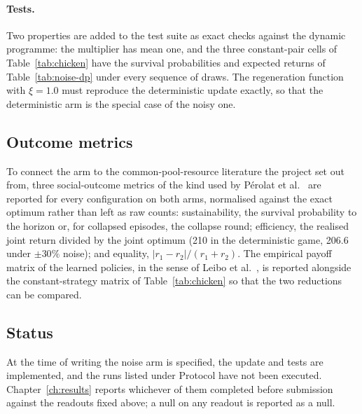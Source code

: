 \paragraph{Tests.}
Two properties are added to the test suite as exact checks against the
dynamic programme: the multiplier has mean one, and the three constant-pair
cells of Table~\ref{tab:chicken} have the survival probabilities and
expected returns of Table~\ref{tab:noise-dp} under every sequence of draws.
The regeneration function with \(\xi = 1.0\) must reproduce the
deterministic update exactly, so that the deterministic arm is the
special case of the noisy one.

\subsection{Outcome metrics}

To connect the arm to the common-pool-resource literature the project set
out from, three social-outcome metrics of the kind used by P\'erolat et
al.\ \cite{perolat2017} are reported for every configuration on both arms,
normalised against the exact optimum rather than left as raw counts:
sustainability, the survival probability to the horizon or, for collapsed
episodes, the collapse round; efficiency, the realised joint return divided
by the joint optimum (210 in the deterministic game, 206.6 under
\(\pm 30\%\) noise); and equality, \(|r_1 - r_2| / (r_1 + r_2)\).
The empirical payoff matrix of the learned policies, in the sense of
Leibo et al.\ \cite{leibo2017}, is reported alongside the constant-strategy
matrix of Table~\ref{tab:chicken} so that the two reductions can be
compared.

\subsection{Status}

At the time of writing the noise arm is specified, the update and tests
are implemented, and the runs listed under Protocol have not been
executed.
Chapter~\ref{ch:results} reports whichever of them completed before
submission against the readouts fixed above; a null on any readout is
reported as a null.
